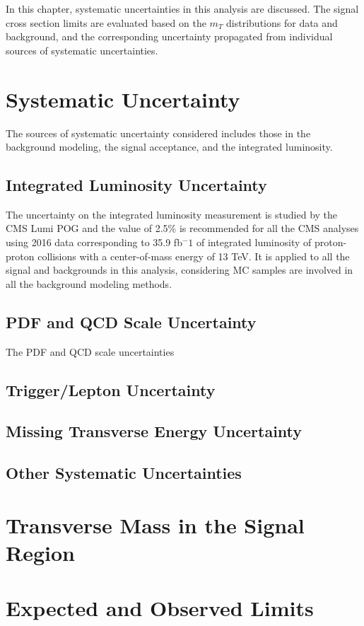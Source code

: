 In this chapter, systematic uncertainties in this analysis are discussed. The signal cross section limits are evaluated based on the $m_T$ distributions for data and background, and the corresponding uncertainty propagated from individual sources of systematic uncertainties.
\section{Systematic Uncertainty}
The sources of systematic uncertainty considered includes those in the background modeling, the signal acceptance, and the integrated luminosity.
\subsection{Integrated Luminosity Uncertainty}
The uncertainty on the integrated luminosity measurement is studied by the CMS Lumi POG and the value of 2.5\% is recommended for all the CMS analyses using 2016 data corresponding to 35.9 fb$^-1$ of integrated luminosity of proton-proton collisions with a center-of-mass energy of 13 TeV. It is applied to all the signal and backgrounds in this analysis, considering MC samples are involved in all the background modeling methods.
\subsection{PDF and QCD Scale Uncertainty}
The PDF and QCD scale uncertainties
\subsection{Trigger/Lepton Uncertainty}
\subsection{Missing Transverse Energy Uncertainty}
\subsection{Other Systematic Uncertainties}

\section{Transverse Mass in the Signal Region}

\section{Expected and Observed Limits}


